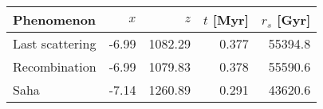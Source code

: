 \begin{tabular}{l|rrrr}
\hline
Phenomenon & $x$ & $z$ & $t$ [Myr] & $r_s$ [Gyr] \\
\hline
Last scattering   & -6.99 & 1082.29 & 0.377 & 55394.8 \\
Recombination     & -6.99 & 1079.83 & 0.378 & 55590.6 \\
Saha              & -7.14 & 1260.89 & 0.291 & 43620.6 \\
\hline
\hline
\end{tabular}
